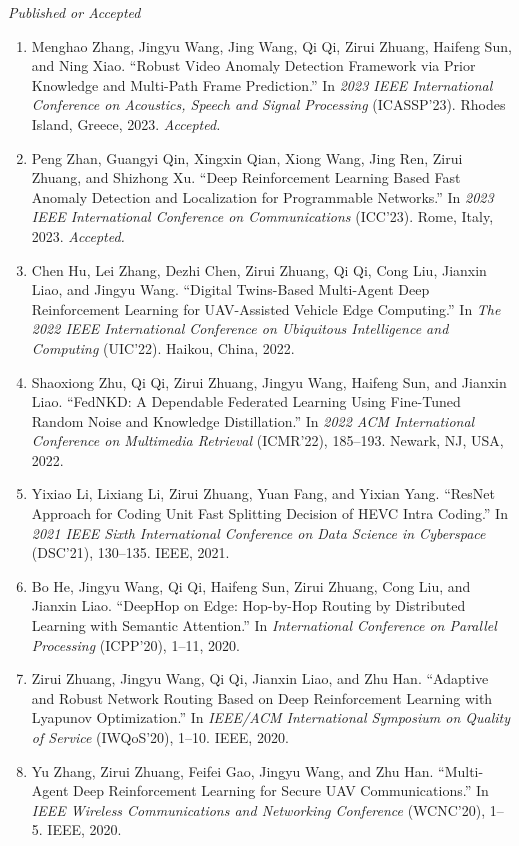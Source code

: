 \documentclass[letterpaper,11pt]{article}
\newcommand{\contentlength}{5.25in} %
\begin{document}
\begin{tcolorbox}[flush right,breakable,colback=white,colframe=white,width=\contentlength]
		\textit{Published or Accepted}
		\begin{enumerate}[itemsep=0mm]
			\item Menghao Zhang, Jingyu Wang, Jing Wang, Qi Qi, Zirui Zhuang, Haifeng Sun, and Ning Xiao. “Robust Video Anomaly Detection Framework via Prior Knowledge and Multi-Path Frame Prediction.” In \textit{2023 IEEE International Conference on Acoustics, Speech and Signal Processing} (ICASSP’23). Rhodes Island, Greece, 2023. \textit{Accepted.}
			\item Peng Zhan, Guangyi Qin, Xingxin Qian, Xiong Wang, Jing Ren, Zirui Zhuang, and Shizhong Xu. “Deep Reinforcement Learning Based Fast Anomaly Detection and Localization for Programmable Networks.” In \textit{2023 IEEE International Conference on Communications} (ICC’23). Rome, Italy, 2023. \textit{Accepted.}
			\item Chen Hu, Lei Zhang, Dezhi Chen, Zirui Zhuang, Qi Qi, Cong Liu, Jianxin Liao, and Jingyu Wang. “Digital Twins-Based Multi-Agent Deep Reinforcement Learning for UAV-Assisted Vehicle Edge Computing.” In \textit{The 2022 IEEE International Conference on Ubiquitous Intelligence and Computing} (UIC’22). Haikou, China, 2022.
			\item Shaoxiong Zhu, Qi Qi, Zirui Zhuang, Jingyu Wang, Haifeng Sun, and Jianxin Liao. “FedNKD: A Dependable Federated Learning Using Fine-Tuned Random Noise and Knowledge Distillation.” In \textit{2022 ACM International Conference on Multimedia Retrieval} (ICMR'22), 185–193. Newark, NJ, USA, 2022.
			\item Yixiao Li, Lixiang Li, Zirui Zhuang, Yuan Fang, and Yixian Yang. “ResNet Approach for Coding Unit Fast Splitting Decision of HEVC Intra Coding.” In \textit{2021 IEEE Sixth International Conference on Data Science in Cyberspace} (DSC'21), 130–135. IEEE, 2021.
			\item Bo He, Jingyu Wang, Qi Qi, Haifeng Sun, Zirui Zhuang, Cong Liu, and Jianxin Liao. “DeepHop on Edge: Hop-by-Hop Routing by Distributed Learning with Semantic Attention.” In \textit{International Conference on Parallel Processing} (ICPP'20), 1–11, 2020.
			\item Zirui Zhuang, Jingyu Wang, Qi Qi, Jianxin Liao, and Zhu Han. “Adaptive and Robust Network Routing Based on Deep Reinforcement Learning with Lyapunov Optimization.” In \textit{IEEE/ACM International Symposium on Quality of Service} (IWQoS'20), 1–10. IEEE, 2020.
			\item Yu Zhang, Zirui Zhuang, Feifei Gao, Jingyu Wang, and Zhu Han. “Multi-Agent Deep Reinforcement Learning for Secure UAV Communications.” In \textit{IEEE Wireless Communications and Networking Conference} (WCNC'20), 1–5. IEEE, 2020.

\end{enumerate}
\end{tcolorbox}
\end{document}
